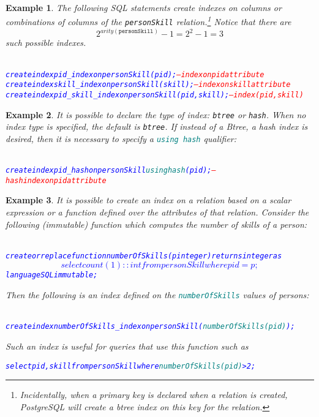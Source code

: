 \documentclass{article}
\newtheorem{example}{Example}
\begin{document}
\begin{example}
The following SQL statements create indexes on columns or combinations
of columns of the {\tt personSkill} relation.\footnote{Incidentally, when a primary key is declared when 
a relation is created, PostgreSQL will create a btree index on this key for the relation.}   Notice that there are \[2^{arity(\mathtt{personSkill})}-1 = 2^2-1 = 3\] such possible
indexes.  

{\small
\begin{alltt}
\textcolor{blue}{
create index pid_index on personSkill (pid);                  \textcolor{red}{-- index on pid attribute}
create index skill_index on personSkill (skill);              \textcolor{red}{-- index on skill attribute}
create index pid_skill_index on personSkill (pid,skill);      \textcolor{red}{-- index (pid, skill)}
}
\end{alltt}}
\end{example}
\begin{example}
It is possible to declare the type of index: {\tt btree} or {\tt hash}. When no index type is specified, the default is {\tt btree}.
If instead of a Btree, a \emph{hash index} is desired, then it is necessary
to specify a \textcolor{teal}{\tt using hash} qualifier:
{\small
\begin{alltt}
\textcolor{blue}{
create index pid_hash on personSkill \textcolor{teal}{using hash} (pid);  \textcolor{red}{-- hash index on pid attribute }                                                                                                                                              
}
\end{alltt}}
\end{example}

\begin{example}
It is possible to create an index on a relation based on a \emph{scalar expression} or a \emph{function} defined over the attributes
of that relation.    Consider the following (immutable) function which computes the number of skills of a person:
{\small
\begin{alltt}
\textcolor{blue}{
create or replace function numberOfSkills(p integer) returns integer as
$$
    select count(1)::int 
    from   personSkill 
    where  pid = p;
$$ language SQL immutable;}
\end{alltt}
}                                                                                                  
Then the following is an index defined on the \textcolor{teal}{\tt numberOfSkills} values of persons:
{\small
\begin{alltt}
\textcolor{blue}{
create index numberOfSkills_index on personSkill (\textcolor{teal}{numberOfSkills(pid)});}
\end{alltt}
Such an index is useful for queries that use this function such as
\begin{alltt}
\textcolor{blue}{select pid, skill from personSkill where \textcolor{teal}{numberOfSkills(pid)} > 2;}
\end{alltt}
}
\end{example}
\end{document}

